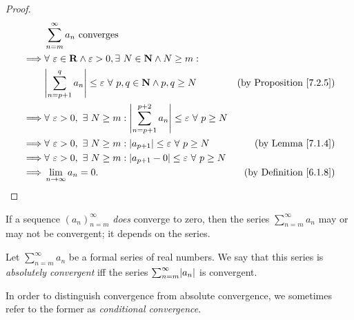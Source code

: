 \begin{proof}
    \begin{align*}
                 & \sum_{n = m}^\infty a_n \text{ converges}                                                                                                                      \\
        \implies & \forall\ \varepsilon \in \mathbf{R} \land \varepsilon > 0, \exists\ N \in \mathbf{N} \land N \geq m :                                                          \\
                 & \abs*{\sum_{n = p + 1}^q a_n} \leq \varepsilon \ \forall\ p, q \in \mathbf{N} \land p, q \geq N                          & \text{(by Proposition \ref{7.2.5})} \\
        \implies & \forall\ \varepsilon > 0, \ \exists\ N \geq m : \abs*{\sum_{n = p + 1}^{p + 2} a_n} \leq \varepsilon \ \forall\ p \geq N                                       \\
        \implies & \forall\ \varepsilon > 0, \ \exists\ N \geq m : \abs*{a_{p + 1}} \leq \varepsilon \ \forall\ p \geq N                    & \text{(by Lemma \ref{7.1.4})}       \\
        \implies & \forall\ \varepsilon > 0, \ \exists\ N \geq m : \abs*{a_{p + 1} - 0} \leq \varepsilon \ \forall\ p \geq N                                                      \\
        \implies & \lim_{n \to \infty} a_n = 0.                                                                                             & \text{(by Definition \ref{6.1.8})}
    \end{align*}
\end{proof}

\begin{note}
    If a sequence \((a_n)_{n = m}^\infty\) \emph{does} converge to zero, then the series \(\sum_{n = m}^\infty a_n\) may or may not be convergent;
    it depends on the series.
\end{note}

\setcounter{theorem}{7}
\begin{definition}\label{7.2.8}
    Let \(\sum_{n = m}^\infty a_n\) be a formal series of real numbers.
    We say that this series is \emph{absolutely convergent} iff the series \(\sum_{n = m}^\infty \abs*{a_n}\) is convergent.
\end{definition}

\begin{note}
    In order to distinguish convergence from absolute convergence, we sometimes refer to the former as \emph{conditional convergence}.
\end{note}

